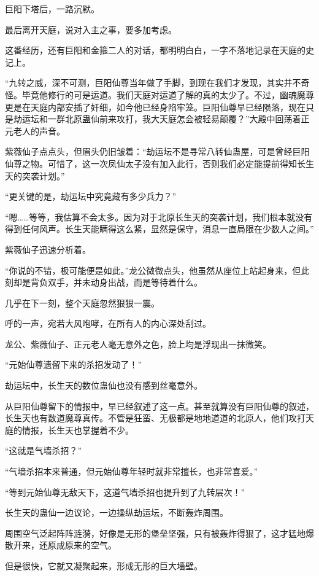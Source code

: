 \begin{this_body}
巨阳下塔后，一路沉默。

最后离开天庭，说对入主之事，要多加考虑。

这番经历，还有巨阳和金箍二人的对话，都明明白白，一字不落地记录在天庭的史记上。

“九转之威，深不可测，巨阳仙尊当年做了手脚，到现在我们才发现，其实并不奇怪。毕竟他修行的可是运道。我们天庭对运道了解的真的太少了。不过，幽魂魔尊更是在天庭内部安插了奸细，如今他已经身陷牢笼。巨阳仙尊早已经陨落，现在只是劫运坛和一群北原蛊仙前来攻打，我大天庭怎会被轻易颠覆？”大殿中回荡着正元老人的声音。

紫薇仙子点点头，但眉头仍旧皱着：“劫运坛不是寻常八转仙蛊屋，可是曾经巨阳仙尊之物。可惜了，这一次凤仙太子没有加入此行，否则我们必定能提前得知长生天的突袭计划。”

“更关键的是，劫运坛中究竟藏有多少兵力？”

“嗯……等等，我估算不会太多。因为对于北原长生天的突袭计划，我们根本就没有得到任何风声。长生天能瞒得这么紧，显然是保守，消息一直局限在少数人之间。”

紫薇仙子迅速分析着。

“你说的不错，极可能便是如此。”龙公微微点头，他虽然从座位上站起身来，但此刻却是背负双手，并未动身出战，而是等待着什么。

几乎在下一刻，整个天庭忽然狠狠一震。

呼的一声，宛若大风咆哮，在所有人的内心深处刮过。

龙公、紫薇仙子、正元老人毫无意外之色，脸上均是浮现出一抹微笑。

“元始仙尊遗留下来的杀招发动了！”

劫运坛中，长生天的数位蛊仙也没有感到丝毫意外。

从巨阳仙尊留下的情报中，早已经叙述了这一点。甚至就算没有巨阳仙尊的叙述，长生天也有数道魔尊真传。不管是狂蛮、无极都是地地道道的北原人，他们攻打天庭的情报，长生天也掌握着不少。

“这就是气墙杀招？”

“气墙杀招本来普通，但元始仙尊年轻时就非常擅长，也非常喜爱。”

“等到元始仙尊无敌天下，这道气墙杀招也提升到了九转层次！”

长生天的蛊仙一边议论，一边操纵劫运坛，不断轰炸周围。

周围空气泛起阵阵涟漪，好像是无形的堡垒坚强，只有被轰炸得狠了，这才猛地爆散开来，还原成原来的空气。

但是很快，它就又凝聚起来，形成无形的巨大墙壁。


\end{this_body}
